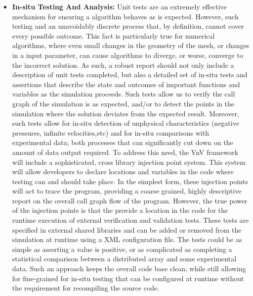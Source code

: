 \begin{itemize}
  \item{ \bf In-situ Testing And Analysis:} Unit tests are an extremely effective mechanism for ensuring a algorithm behaves as is expected. However, such testing 
  and an unavoidably discrete process that, by definition, cannot cover every possible outcome. This fact is particularly true for numerical algorithms, where even small 
  changes in the geometry of the mesh, or changes in a input parameter, can cause algorithms to diverge, or worse, converge to the incorrect solution. As such, a robust
  \VV report should not only include a description of unit tests completed, but also a detailed set of in-situ tests and assertions that describe the state and outcomes
  of important functions and variables as the simulation proceeds. Such tests allow us to verify the call graph of the simulation is as expected, and/or to detect the points
  in the simulation where the solution deviates from the expected result. Moreover, such tests allow for in-situ detection of unphysical characteristics (negative pressures, infinite 
  velocities,etc) and for in-situ comparisons with experimental data; both processes that can significantly cut down on the amount of data output required. To address this need, the VnV framework will include a sophisticated, cross library injection point system. This system will allow developers to declare locations and variables in the code where \VV testing can and should take place. In the simplest form, these injection points will act to trace the program, providing a coarse grained, highly descriptive report on the overall call graph flow of the program. However, the true power of the injection points is that the provide a location in the code for the runtime execution of external verification and validation tests. These tests are specified in external shared libraries and can be added or removed from the simulation at runtime using a XML configuration file. The tests could be as simple as asserting a value is positive, or as complicated as completing a statistical comparison between a distributed array and some experimental data. Such an approach keeps the overall code base clean, while still allowing for fine-grained for in-situ \VV testing that can be configured at runtime without the requirement for recompiling the source code. 

\end{itemize}
